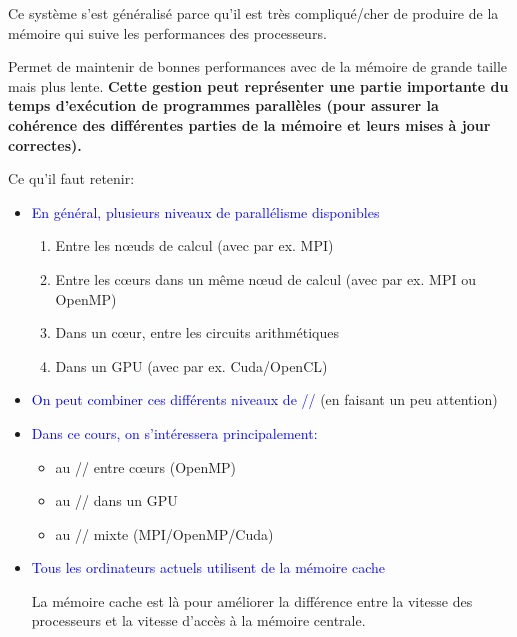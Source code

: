 \documentclass{beamer}
\begin{document}
\begin{frame}[fragile]
	
	\vfill
Ce système s'est généralisé parce qu'il est très compliqué/cher de produire de la mémoire qui suive les performances des processeurs. 

Permet de maintenir de bonnes performances avec de la mémoire de grande taille mais plus lente.
	\vfill
{\bf Cette gestion peut repr\'esenter une partie im\-por\-tante du temps d'ex\'ecution de programmes parallèles (pour assurer la coh\'erence des diff\'erentes parties de la m\'emoire et leurs mises \`a jour correctes).}
	\vfill	
	
\end{frame}
\begin{frame}
	Ce qu'il faut retenir:

	\begin{itemize}
		\item \textcolor{blue}{En général, plusieurs niveaux de parallélisme disponibles}
		\begin{enumerate}
			\item Entre les nœuds de calcul (avec par ex. MPI)
			\item Entre les cœurs dans un même nœud de calcul (avec par ex. MPI ou OpenMP)
			\item Dans un cœur, entre les circuits arithmétiques 
			\item Dans un GPU (avec par ex. Cuda/OpenCL)
		\end{enumerate}
		\medskip
		
		\item  \textcolor{blue}{On peut combiner ces différents niveaux de //} (en faisant un peu attention) 
		\medskip
		
		\item  \textcolor{blue}{Dans ce cours, on s'intéressera principalement:}
		\begin{itemize}
			\item au // entre cœurs (OpenMP)
			\item au // dans un GPU
			\item au // mixte (MPI/OpenMP/Cuda)
		\end{itemize}
		\medskip
		\item \textcolor{blue}{Tous les ordinateurs actuels utilisent de la mémoire cache}
	
	    La mémoire cache est là pour améliorer la différence entre la vitesse des processeurs et la vitesse d'accès à la mémoire centrale.
	\end{itemize}
\end{frame}
\end{document}
